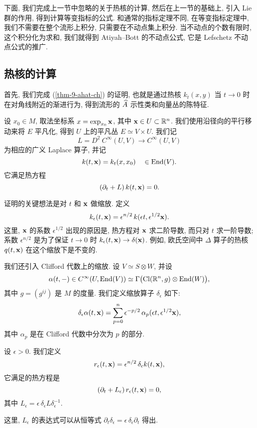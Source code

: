 下面, 我们完成上一节中忽略的关于热核的计算,
然后在上一节的基础上, 引入 Lie 群的作用, 得到计算等变指标的公式.
和通常的指标定理不同, 在等变指标定理中, 我们不需要在整个流形上积分,
只需要在不动点集上积分.
当不动点的个数有限时, 这个积分化为求和,
我们就得到 Atiyah--Bott 的不动点公式, 它是 Lefschetz 不动点公式的推广.


\subsection{热核的计算}

首先, 我们完成 (\ref{thm-9-ahat-ch}) 的证明,
也就是通过热核 $k_t (x, y)$ 当 $t \to 0$ 时在对角线附近的渐进行为,
得到流形的 $\widehat{A}$ 示性类和向量丛的陈特征.

设 $x_0 \in M$, 取法坐标系 $x = \exp_{x_0} \mathbf{x}$, 其中 $\mathbf{x} \in U \subset \mathbb{R}^n$.
我们使用沿径向的平行移动来将 $E$ 平凡化,
得到 $U$ 上的平凡丛 $E \simeq V \times U$. 我们记
\[ L = D^2 \: C^\infty (U, V) \to C^\infty (U, V) \]
为相应的广义 Laplace 算子, 并记
\[ k (t, \mathbf{x}) = k_t (x, x_0) \quad \in \operatorname{End} (V). \]
它满足热方程
\[ (\partial_t + L) \, k (t, \mathbf{x}) = 0. \]

证明的关键想法是对 $t$ 和 $\mathbf{x}$ 做缩放. 定义
\[ k_\epsilon (t, \bfx) = \epsilon^{n/2} \, k(\epsilon t, \epsilon^{1/2} \bfx). \]
这里, $\mathbf{x}$ 的系数 $\epsilon^{1/2}$ 出现的原因是,
热方程对 $\mathbf{x}$ 求二阶导数, 而只对 $t$ 求一阶导数;
系数 $\epsilon^{n/2}$ 是为了保证 $t \to 0$ 时 
$k_{\epsilon} (t, \bfx) \to \delta (\bfx)$.
例如, 欧氏空间中 $\Delta$ 算子的热核 $q (t, \mathbf{x})$ 在这个缩放下是不变的.

我们还引入 Clifford 代数上的缩放.
设 $V \simeq S \otimes W$, 并设
\[ \alpha (t, -) \in C^\infty (U, \operatorname{End} (V)) \simeq 
    \Gamma \bigl( \operatorname{Cl} (\mathbb{R}^n, g) \otimes \operatorname{End} (W) \bigr), \]
其中 $g = (g^{ij})$ 是 $M$ 的度量.
我们定义缩放算子 $\delta_\epsilon$ 如下:
\[ \delta_\epsilon \alpha (t, \bfx) =
    \sum_{p=0}^n \epsilon^{-p/2} \, \alpha_p (\epsilon t, \epsilon^{1/2} \bfx), \]
其中 $\alpha_p$ 是在 Clifford 代数中分次为 $p$ 的部分.

\begin{definition}
    设 $\epsilon > 0$. 我们定义
    \[ r_\epsilon (t, \bfx) = \epsilon^{n/2} \, \delta_\epsilon k (t, \bfx), \]
    它满足的热方程是
    \[ (\partial_t + L_\epsilon) \, r_\epsilon (t, \bfx) = 0, \]
    其中 $L_\epsilon = \epsilon \, \delta_\epsilon L \delta_\epsilon^{-1}$.
\end{definition}

这里, $L_\epsilon$ 的表达式可以从恒等式
$\partial_t \delta_\epsilon = \epsilon \, \delta_\epsilon \partial_t$ 得出.

